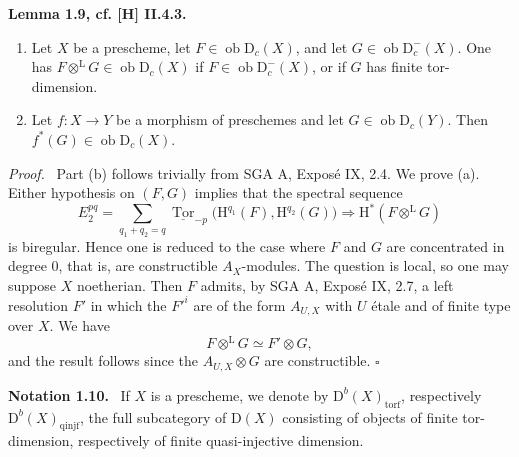 \documentclass[11pt]{article}
\providecommand{\Hh}{\mathrm{H}}
\providecommand{\qedtext}{\hfill$\square$}
\newenvironment{statement}[1]{\par\medskip\noindent\textbf{#1.}\ }{\par\medskip}
\newenvironment{prooftext}[1][Proof]{\par\noindent\emph{#1.}\ }{\par\medskip}
\DeclareMathOperator{\Tor}{Tor}
\newcommand{\D}{\mathrm{D}}
\newcommand{\ob}{\operatorname{ob}}
\providecommand{\ob}{\operatorname{ob}}
\providecommand{\qedtext}{\hfill$\square$}
\begin{document}
\begin{statement}{Lemma 1.9, cf. [H] II.4.3}
\begin{enumerate}[label=\alph*)]
\item Let $X$ be a prescheme, let $F\in\ob\D_c(X)$, and let $G\in\ob\D_c^-(X)$. One has $F\otimes^{\mathrm L}G\in\ob\D_c(X)$ if $F\in\ob\D_c^-(X)$, or if $G$ has finite tor-dimension.
\item Let $f:X\to Y$ be a morphism of preschemes and let $G\in\ob\D_c(Y)$. Then $f^*(G)\in\ob\D_c(X)$.
\end{enumerate}
\end{statement}

\begin{prooftext}
Part (b) follows trivially from SGA A, Exposé IX, 2.4. We prove (a). Either hypothesis on $(F,G)$ implies that the spectral sequence
\[
   E_2^{pq}=\sum_{q_1+q_2=q}\underline{\Tor}_{-p}\bigl(\Hh^{q_1}(F),\Hh^{q_2}(G)\bigr)
       \Rightarrow \Hh^*(F\otimes^{\mathrm L}G)
\]
is biregular. Hence one is reduced to the case where $F$ and $G$ are concentrated in degree $0$, that is, are constructible $A_X$-modules. The question is local, so one may suppose $X$ noetherian. Then $F$ admits, by SGA A, Exposé IX, 2.7, a left resolution $F'$ in which the $F'^i$ are of the form $A_{U,X}$ with $U$ étale and of finite type over $X$. We have
\[
   F\otimes^{\mathrm L}G\simeq F'\otimes G,
\]
and the result follows since the $A_{U,X}\otimes G$ are constructible. \qedtext
\end{prooftext}

\begin{statement}{Notation 1.10}
If $X$ is a prescheme, we denote by $\D^b(X)_{\mathrm{torf}}$, respectively $\D^b(X)_{\mathrm{qinjf}}$, the full subcategory of $\D(X)$ consisting of objects of finite tor-dimension, respectively of finite quasi-injective dimension.
\end{statement}
\end{document}

